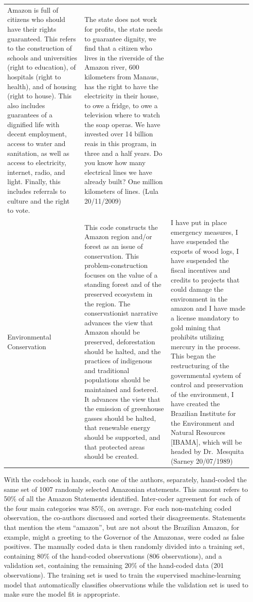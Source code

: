 \documentclass[]{interact}
\theoremstyle{plain}%
\theoremstyle{definition}
\theoremstyle{remark}
\begin{document}
\begin{longtable}[]{@{}lll@{}}
Amazon is full of citizens who should have their rights guaranteed. This
refers to the construction of schools and universities (right to
education), of hospitals (right to health), and of housing (right to
house). This also includes guarantees of a dignified life with decent
employment, access to water and sanitation, as well as access to
electricity, internet, radio, and light. Finally, this includes
referrals to culture and the right to vote. & The state does not work
for profits, the state needs to guarantee dignity, we find that a
citizen who lives in the riverside of the Amazon river, 600 kilometers
from Manaus, has the right to have the electricity in their house, to
owe a fridge, to owe a television where to watch the soap operas. We
have invested over 14 billion reais in this program, in three and a half
years. Do you know how many electrical lines we have already built? One
million kilometers of lines. (Lula 20/11/2009) \\
Environmental Conservation & This code constructs the Amazon region
and/or forest as an issue of conservation. This problem-construction
focuses on the value of a standing forest and of the preserved ecosystem
in the region. The conservationist narrative advances the view that
Amazon should be preserved, deforestation should be halted, and the
practices of indigenous and traditional populations should be maintained
and fostered. It advances the view that the emission of greenhouse
gasses should be halted, that renewable energy should be supported, and
that protected areas should be created. & I have put in place emergency
measures, I have suspended the exports of wood logs, I have suspended
the fiscal incentives and credits to projects that could damage the
environment in the amazon and I have made a license mandatory to gold
mining that prohibits utilizing mercury in the process. This began the
restructuring of the governmental system of control and preservation of
the environment, I have created the Brazilian Institute for the
Environment and Natural Resources {[}IBAMA{]}, which will be headed by
Dr.~Mesquita (Sarney 20/07/1989) \\
\bottomrule
\end{longtable}

With the codebook in hands, each one of the authors, separately,
hand-coded the same set of 1007 randomly selected Amazonian statements.
This amount refers to 50\% of all the Amazon Statements identified.
Inter-coder agreement for each of the four main categories was 85\%, on
average. For each non-matching coded observation, the co-authors
discussed and sorted their disagreements. Statements that mention the
stem ``amazon'', but are not about the Brazilian Amazon, for example,
might a greeting to the Governor of the Amazonas, were coded as false
positives. The manually coded data is then randomly divided into a
training set, containing 80\% of the hand-coded observations (806
observations), and a validation set, containing the remaining 20\% of
the hand-coded data (201 observations). The training set is used to
train the supervised machine-learning model that automatically
classifies observations while the validation set is used to make sure
the model fit is appropriate.
\end{document}
